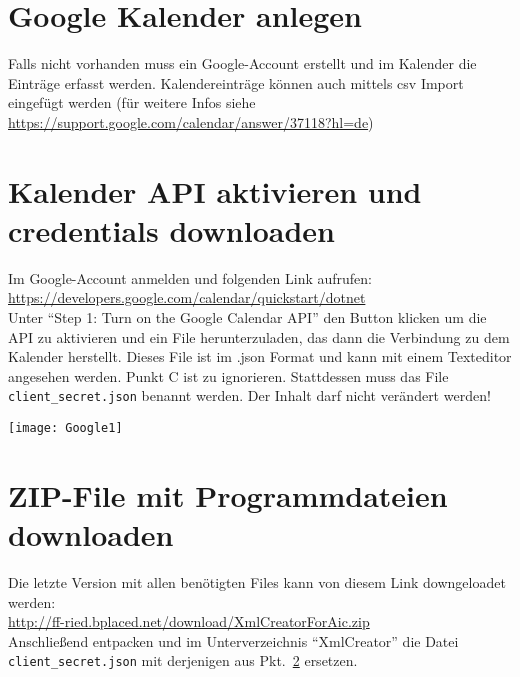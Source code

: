 \documentclass[a4paper,onecolumn,notitlepage,11pt,liststotoc,bibtotoc]{scrartcl}
\begin{document}
\section{Google Kalender anlegen}
Falls nicht vorhanden muss ein Google-Account erstellt und im Kalender die Einträge erfasst werden. Kalendereinträge können auch mittels csv Import eingefügt werden (für weitere Infos siehe \url{https://support.google.com/calendar/answer/37118?hl=de})
%
\section{Kalender API aktivieren und credentials downloaden}
\label{sec:cred}
Im Google-Account anmelden und folgenden Link aufrufen:\\
\url{https://developers.google.com/calendar/quickstart/dotnet}\\
Unter "`Step 1: Turn on the Google Calendar API"' den Button klicken um die API zu aktivieren und ein File herunterzuladen, das dann die Verbindung zu dem Kalender herstellt. Dieses File ist im .json Format und kann mit einem Texteditor angesehen werden.
Punkt C ist zu ignorieren. Stattdessen muss das File \texttt{client\_secret.json} benannt werden. Der Inhalt darf nicht verändert werden!
\begin{center}
  \texttt{[image: Google1]}
\end{center}
%
\section{ZIP-File mit Programmdateien downloaden}
Die letzte Version mit allen benötigten Files kann von diesem Link downgeloadet werden:\\
\url{http://ff-ried.bplaced.net/download/XmlCreatorForAic.zip}\\
Anschließend entpacken und im Unterverzeichnis "`XmlCreator"' die Datei \texttt{client\_secret.json} mit derjenigen aus Pkt.~\ref{sec:cred} ersetzen.
%
\end{document}
